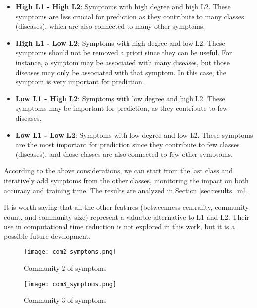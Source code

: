 \begin{itemize}
    \setlength\itemsep{1em}
    \item \textbf{High L1 - High L2}: Symptoms with high degree and high L2. These symptoms are less crucial for 
    prediction as they contribute to many classes (diseases), which are also connected to many other symptoms.
    \item \textbf{High L1 - Low L2}: Symptoms with high degree and low L2. These symptoms should not be removed a 
    priori since they can be useful. For instance, a symptom may be associated with many diseases, but those 
    diseases may only be associated with that symptom. In this case, the symptom is very important for prediction.
    \item \textbf{Low L1 - High L2}: Symptoms with low degree and high L2. These symptoms may be important for 
    prediction, as they contribute to few diseases.
    \item \textbf{Low L1 - Low L2}: Symptoms with low degree and low L2. These symptoms are the most important 
    for prediction since they contribute to few classes (diseases), and those classes are also connected to 
    few other symptoms.
\end{itemize}

According to the above considerations, we can start from the last class and iteratively add symptoms from the 
other classes, monitoring the impact on both accuracy and training time. 
The results are analyzed in Section \ref{sec:results_ml}.

It is worth saying that all the other features (betweenness centrality, community count, and community size)
represent a valuable alternative to L1 and L2. Their use in computational time reduction is not explored in this work,
but it is a possible future development.











\begin{figure}[H]
    \centering
    \texttt{[image: com2\_symptoms.png]}
    \caption{Community 2 of symptoms}
    \label{fig:com2_symptoms}
\end{figure}

\begin{figure}[H]
    \centering
    \texttt{[image: com3\_symptoms.png]}
    \caption{Community 3 of symptoms}
    \label{fig:com3_symptoms}
\end{figure}



